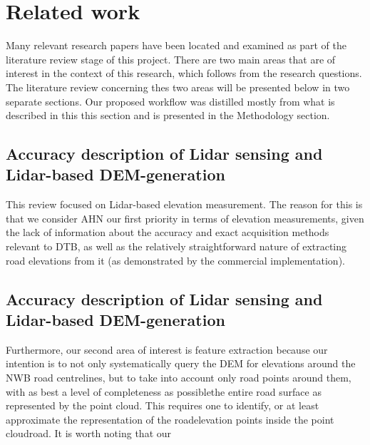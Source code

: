 
\chapter{Related work}
\label{chap:rw}

Many relevant research papers have been located and examined as part of the literature review stage of this project. There are two main areas that are of interest in the context of this research, which follows from the research questions. The literature review concerning thes two areas will be presented below in two separate sections. Our proposed workflow was distilled mostly from what is described in this this section and is presented in the Methodology section.

\section*{Accuracy description of Lidar sensing and Lidar-based DEM-generation}

This review focused on Lidar-based elevation measurement. The reason for this is that we consider AHN our first priority in terms of elevation measurements, given the lack of information about the accuracy and exact acquisition methods relevant to DTB, as well as the relatively straightforward nature of extracting road elevations from it (as demonstrated by the commercial implementation). 

\section*{Accuracy description of Lidar sensing and Lidar-based DEM-generation}

Furthermore, our second area of interest is feature extraction because our intention is to not only systematically query the DEM for elevations around the NWB road centrelines, but to take into account only road points around them, with as best a level of completeness as possiblethe entire road surface as represented by the point cloud. This requires one to identify, or at least approximate the representation of the roadelevation points inside the point cloudroad. It is worth noting that our